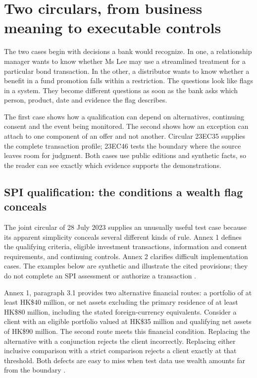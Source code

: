 \chapter{Two circulars, from business meaning to executable controls}
\label{ch:circular}

The two cases begin with decisions a bank would recognize. In one, a relationship
manager wants to know whether Ms Lee may use a streamlined treatment for a
particular bond transaction. In the other, a distributor wants to know whether
a benefit in a fund promotion falls within a restriction. The questions look
like flags in a system. They become different questions as soon as the bank asks
which person, product, date and evidence the flag describes.

The first case shows how a qualification can depend on alternatives, continuing
consent and the event being monitored. The second shows how an exception can
attach to one component of an offer and not another. Circular 23EC35 supplies
the complete transaction profile; 23EC46 tests the boundary where the source
leaves room for judgment. Both cases use public editions and synthetic facts, so
the reader can see exactly which evidence supports the demonstrations.

\section{SPI qualification: the conditions a wealth flag conceals}
\label{merge:P-01-problem:02}

\label{sec:spi}

The joint circular of 28 July 2023 supplies an unusually useful test case because
its apparent simplicity conceals several different kinds of rule. Annex 1
defines the qualifying criteria, eligible investment transactions, information
and consent requirements, and continuing controls. Annex 2 clarifies difficult
implementation cases. The examples below are synthetic and illustrate the cited
provisions; they do not complete an SPI assessment or authorize a transaction
\citep{sfcspi,sfcspiannex1,sfcspiannex2}.


Annex 1, paragraph 3.1 provides two alternative financial routes: a portfolio of
at least HK\$40 million, or net assets excluding the primary residence of at least
HK\$80 million, including the stated foreign-currency equivalents. Consider a
client with an eligible portfolio valued at HK\$35 million and qualifying net
assets of HK\$90 million. The second route meets this financial condition.
Replacing the alternative with a conjunction rejects the client incorrectly.
Replacing either inclusive comparison with a strict comparison rejects a client
exactly at that threshold. Both defects are easy to miss when test data use
wealth amounts far from the boundary \citep[Annex 1, para.~3.1]{sfcspiannex1}.

